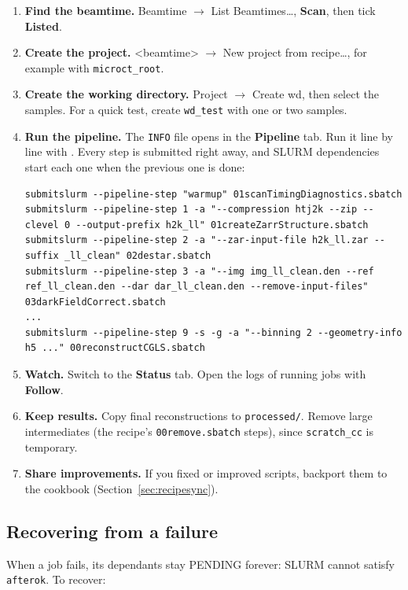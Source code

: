 \documentclass[11pt,a4paper]{article}
\newcommand{\cmd}[1]{\texttt{#1}}
\newcommand{\ui}[1]{\textsf{\textbf{#1}}}
\newcommand{\menu}[1]{\textsf{#1}}
\newcommand{\key}[1]{\tcbox[on line, boxsep=0pt, left=2pt, right=2pt, top=1pt, bottom=1pt, colback=white, colframe=gray!60, boxrule=0.4pt, arc=1.5pt]{\small\ttfamily #1}}
\begin{document}
\begin{enumerate}
  \item \textbf{Find the beamtime.} \menu{Beamtime $\rightarrow$ List Beamtimes\ldots}, \ui{Scan},
    then tick \ui{Listed}.
  \item \textbf{Create the project.} \menu{<beamtime> $\rightarrow$ New project from recipe\ldots},
    for example with \cmd{microct\_root}.
  \item \textbf{Create the working directory.} \menu{Project $\rightarrow$ Create wd}, then select
    the samples. For a quick test, create \cmd{wd\_test} with one or two samples.
  \item \textbf{Run the pipeline.} The \cmd{INFO} file opens in the \ui{Pipeline} tab. Run it line
    by line with \key{Ctrl+Return}. Every step is submitted right away, and SLURM dependencies start
    each one when the previous one is done:
\begin{lstlisting}
submitslurm --pipeline-step "warmup" 01scanTimingDiagnostics.sbatch
submitslurm --pipeline-step 1 -a "--compression htj2k --zip --clevel 0 --output-prefix h2k_ll" 01createZarrStructure.sbatch
submitslurm --pipeline-step 2 -a "--zar-input-file h2k_ll.zar --suffix _ll_clean" 02destar.sbatch
submitslurm --pipeline-step 3 -a "--img img_ll_clean.den --ref ref_ll_clean.den --dar dar_ll_clean.den --remove-input-files" 03darkFieldCorrect.sbatch
...
submitslurm --pipeline-step 9 -s -g -a "--binning 2 --geometry-info h5 ..." 00reconstructCGLS.sbatch
\end{lstlisting}
  \item \textbf{Watch.} Switch to the \ui{Status} tab. Open the logs of running jobs with
    \ui{Follow}.
  \item \textbf{Keep results.} Copy final reconstructions to \cmd{processed/}. Remove large
    intermediates (the recipe's \cmd{00remove.sbatch} steps), since \cmd{scratch\_cc} is
    temporary.
  \item \textbf{Share improvements.} If you fixed or improved scripts, backport them to the
    cookbook (Section~\ref{sec:recipesync}).
\end{enumerate}

\subsection{Recovering from a failure}

When a job fails, its dependants stay PENDING forever: SLURM cannot satisfy \cmd{afterok}.
To recover:
\end{document}
